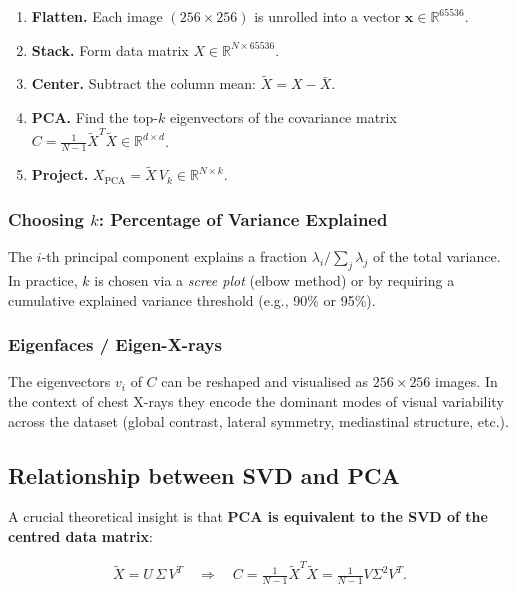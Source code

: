 \documentclass[11pt,a4paper]{article}
\theoremstyle{definition}
\begin{document}
\begin{enumerate}[nosep]
  \item \textbf{Flatten.} Each image $(256\times256)$ is unrolled into a vector $\mathbf{x}\in\mathbb{R}^{65536}$.
  \item \textbf{Stack.} Form data matrix $X \in \mathbb{R}^{N \times 65536}$.
  \item \textbf{Center.} Subtract the column mean: $\tilde X = X - \bar X$.
  \item \textbf{PCA.} Find the top-$k$ eigenvectors of the covariance matrix
        $C = \tfrac{1}{N-1}\tilde X^T \tilde X \in \mathbb{R}^{d \times d}$.
  \item \textbf{Project.} $X_{\text{PCA}} = \tilde X\, V_k \in \mathbb{R}^{N \times k}$.
\end{enumerate}

\subsubsection{Choosing $k$: Percentage of Variance Explained}

The $i$-th principal component explains a fraction
$\lambda_i / \sum_j \lambda_j$ of the total variance.
In practice, $k$ is chosen via a \emph{scree plot} (elbow method) or by
requiring a cumulative explained variance threshold (e.g., 90\% or 95\%).

\subsubsection{Eigenfaces / Eigen-X-rays}

The eigenvectors $v_i$ of $C$ can be reshaped and visualised as
$256\times 256$ images. In the context of chest X-rays they encode the dominant
modes of visual variability across the dataset (global contrast, lateral
symmetry, mediastinal structure, etc.).

\subsection{Relationship between SVD and PCA}
\label{sec:svd-pca}

A crucial theoretical insight is that \textbf{PCA is equivalent to the SVD of
the centred data matrix}:

\[
  \tilde X = U\,\Sigma\, V^T
  \quad\Longrightarrow\quad
  C = \tfrac{1}{N-1}\tilde X^T \tilde X
    = \tfrac{1}{N-1} V\Sigma^2 V^T.
\]
\end{document}
